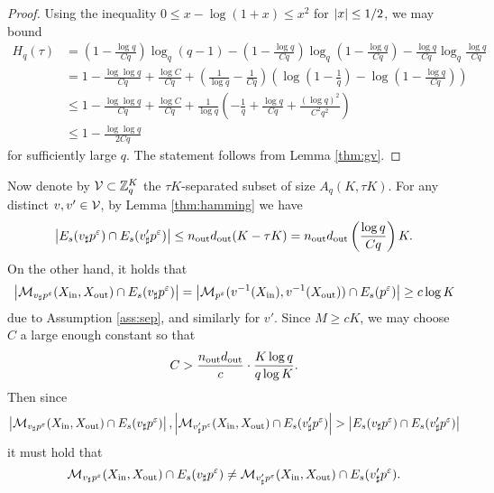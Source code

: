 \begin{proof}
Using the inequality $0\le x-\log(1+x)\le x^2$ for $\left\lvert x\right\rvert\le 1/2$, we may bound
\begin{align*}
H_q(\tau) &= \left(1-\frac{\log q}{Cq}\right) \log_q(q-1) -\left(1-\frac{\log q}{Cq}\right) \log_q \left(1-\frac{\log q}{Cq}\right) -\frac{\log q}{Cq}\log_q \frac{\log q}{Cq} \\
&= 1-\frac{\log \log q}{Cq} + \frac{\log C}{Cq} + \left(\frac{1}{\log q} - \frac{1}{Cq}\right) \left(\log\left(1-\frac{1}{q}\right) - \log\left(1-\frac{\log q}{Cq}\right) \right) \\
&\le 1-\frac{\log \log q}{Cq} + \frac{\log C}{Cq} + \frac{1}{\log q} \left(-\frac{1}{q} + \frac{\log q}{Cq} +\frac{(\log q)^2}{C^2q^2}\right) \\
&\le 1-\frac{\log \log q}{2Cq}
\end{align*}
for sufficiently large $q$. The statement follows from Lemma \ref{thm:gv}.
\end{proof}
Now denote by $\mathcal{V}\subset\mathbb{Z}_q^K$ the $\tau K$-separated subset of size $A_q(K,\tau K)$. For any distinct $v,v'\in\mathcal{V}$, by Lemma \ref{thm:hamming} we have
\begin{equation*}
\left\lvert E_s(v_\sharp p^\varepsilon) \cap E_s(v'_\sharp p^\varepsilon)\right\rvert \le n_{\operatorname{out}}d_{\operatorname{out}} (K-\tau K) = n_{\operatorname{out}}d_{\operatorname{out}}\left(\frac{\log q}{Cq}\right) K.
\end{equation*}
On the other hand, it holds that
\begin{equation*}
\left\lvert\mathcal{M}_{v_\sharp p^\varepsilon}(X_{\operatorname{in}},X_{\operatorname{out}}) \cap E_s(v_\sharp p^\varepsilon)\right\rvert =\left\lvert\mathcal{M}_{p^\varepsilon}(v^{-1}(X_{\operatorname{in}}),v^{-1}(X_{\operatorname{out}})) \cap E_s(p^\varepsilon)\right\rvert  \ge c\log K
\end{equation*}
due to Assumption \ref{ass:sep}, and similarly for $v'$. Since $M\ge cK$, we may choose $C$ a large enough constant so that
\begin{equation*}
C > \frac{n_{\operatorname{out}}d_{\operatorname{out}}}{c}\cdot \frac{K\log q}{q\log K}.
\end{equation*}
Then since
\begin{equation*}
\left\lvert\mathcal{M}_{v_\sharp p^\varepsilon}(X_{\operatorname{in}},X_{\operatorname{out}}) \cap E_s(v_\sharp p^\varepsilon)\right\rvert, \left\lvert\mathcal{M}_{v'_\sharp p^\varepsilon}(X_{\operatorname{in}},X_{\operatorname{out}}) \cap E_s(v'_\sharp p^\varepsilon)\right\rvert > \left\lvert E_s(v_\sharp p^\varepsilon) \cap E_s(v'_\sharp p^\varepsilon)\right\rvert
\end{equation*}
it must hold that
\begin{equation*}
\mathcal{M}_{v_\sharp p^\varepsilon}(X_{\operatorname{in}},X_{\operatorname{out}}) \cap E_s(v_\sharp p^\varepsilon) \neq \mathcal{M}_{v_\sharp' p^\varepsilon}(X_{\operatorname{in}},X_{\operatorname{out}}) \cap E_s(v_\sharp' p^\varepsilon).
\end{equation*}
